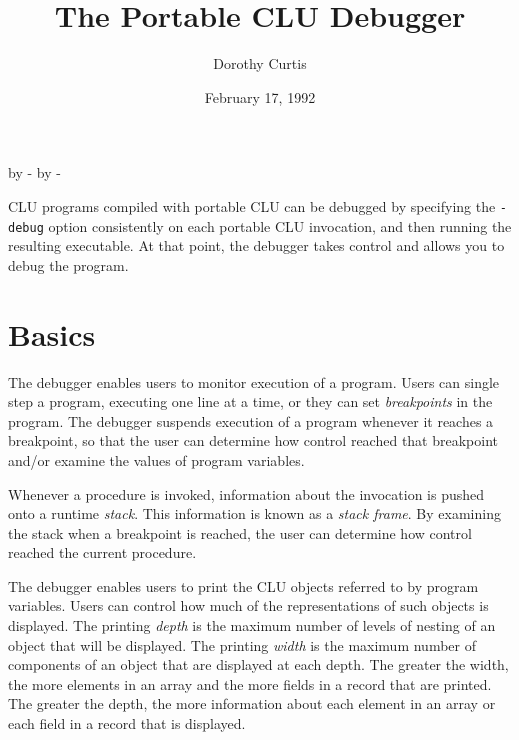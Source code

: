 
\topmargin 0pt
\advance \topmargin by -\headheight
\advance \topmargin by -\headsep
\textheight 8.9in
\oddsidemargin 0pt
\evensidemargin \oddsidemargin
\marginparwidth 0.5in
\textwidth 6.5in

\newcommand{\dir}[1]{{\em #1}}
\newcommand{\proc}[1]{{\em #1}}
\newcommand{\cludir}[1]{\dir{\~{}CLU}{\em #1}}
\newcommand{\fname}[1]{{\em #1}}
\newenvironment{boxdisplay}{\begin{center}\begin{tabular}{|l|}\hline}{\hline\end{tabular}\end{center}}

\title{The Portable CLU Debugger}
\author{Dorothy Curtis}
\date{February 17, 1992}



\maketitle

\noindent CLU programs compiled with portable CLU can be debugged by
specifying the \verb|-debug| option consistently on each portable CLU
invocation, and then running the resulting executable.  At that point,
the debugger takes control and allows you to debug the program.

\section{Basics}

The debugger enables users to monitor execution of a program.  Users
can single step a program, executing one line at a time, or they can
set {\em breakpoints} in the program.  The debugger suspends execution
of a program whenever it reaches a breakpoint, so that the user can
determine how control reached that breakpoint and/or examine the
values of program variables.

Whenever a procedure is invoked, information about the invocation is
pushed onto a runtime {\em stack}.  This information is known as a
{\em stack frame}.  By examining the stack when a breakpoint is
reached, the user can determine how control reached the current
procedure.

The debugger enables users to print the CLU objects referred to by
program variables.  Users can control how much of the representations
of such objects is displayed.  The printing {\em depth} is the maximum
number of levels of nesting of an object that will be displayed.  The
printing {\em width} is the maximum number of components of an object
that are displayed at each depth.  The greater the width, the more
elements in an array and the more fields in a record that are printed.
The greater the depth, the more information about each element in an
array or each field in a record that is displayed.

